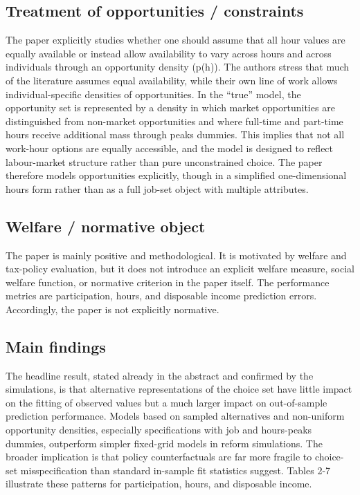 \documentclass[11pt,a4paper]{article}
\begin{document}
\subsection*{Treatment of opportunities / constraints}
The paper explicitly studies whether one should assume that all hour values are equally available or instead allow availability to vary across hours and across individuals through an opportunity density (p(h)). The authors stress that much of the literature assumes equal availability, while their own line of work allows individual-specific densities of opportunities. In the “true” model, the opportunity set is represented by a density in which market opportunities are distinguished from non-market opportunities and where full-time and part-time hours receive additional mass through peaks dummies. This implies that not all work-hour options are equally accessible, and the model is designed to reflect labour-market structure rather than pure unconstrained choice. The paper therefore models opportunities explicitly, though in a simplified one-dimensional hours form rather than as a full job-set object with multiple attributes.

\subsection*{Welfare / normative object}
The paper is mainly positive and methodological. It is motivated by welfare and tax-policy evaluation, but it does not introduce an explicit welfare measure, social welfare function, or normative criterion in the paper itself. The performance metrics are participation, hours, and disposable income prediction errors. Accordingly, the paper is not explicitly normative.

\subsection*{Main findings}
The headline result, stated already in the abstract and confirmed by the simulations, is that alternative representations of the choice set have little impact on the fitting of observed values but a much larger impact on out-of-sample prediction performance. Models based on sampled alternatives and non-uniform opportunity densities, especially specifications with job and hours-peaks dummies, outperform simpler fixed-grid models in reform simulations. The broader implication is that policy counterfactuals are far more fragile to choice-set misspecification than standard in-sample fit statistics suggest. Tables 2-7 illustrate these patterns for participation, hours, and disposable income.
\end{document}

